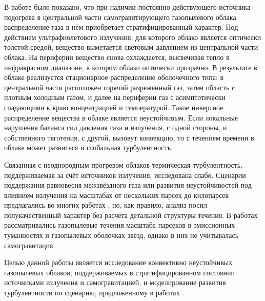 \documentclass[a4paper,11pt,twoside]{article}
\begin{document}
В работе \cite{Zhukova2012} было показано, что при наличии постоянно действующего источника подогрева в центральной части самогравитирующего газопылевого облака распределение газа в нём приобретает стратифицированный характер. Под действием ультрафиолетового излучения, для которого облако является оптически толстой средой, вещество выметается световым давлением из центральной части облака. На периферии вещество снова охлаждается, высвечивая тепло в инфракрасном диапазоне, в котором облако оптически прозрачно. В результате в облаке реализуется стационарное распределение оболочечного типа: в центральной части расположен горячий разреженный газ, затем область с плотным холодным газом, и далее на периферии газ с асимптотически спадающими к краю концентрацией и температурой. Такое инверсное распределение вещества в облаке является неустойчивым. Если локальные нарушения баланса сил давления газа и излучения, с одной стороны, и собственного тяготения, с другой, вызовут конвекцию, то с течением времени в облаке может развиться и глобальная турбулентность.


Связанная с неоднородным прогревом облаков термическая турбулентность, поддерживаемая за счёт источников излучения, исследована слабо.
Сценарии поддержания равновесия межзвёздного газа или развития неустойчивостей под влиянием излучения на масштабах от нескольких парсек до килопарсек предлагались во многих работах \cite{Bianci2005, Ferrara1993, Murray2010}, но, как правило, анализ носил полукачественный характер без расчёта детальной структуры течения. В работах \cite{Freytag2009,Heofner1995,Kreuger1994,Kreuger1997,Mastrodemos1996,Ochsendorf2014,Ochsendorf2014-2,Simis2001,Sorrell2002,Woitke2006} рассматривались газопылевые течения масштаба парсеков в эмиссионных туманностях и газопылевых оболочках звёзд, однако в них не учитывалась самогравитация.

Целью данной работы является исследование конвективно неустойчивых газопылевых облаков, поддерживаемых в стратифицированном состоянии источниками излучения и самогравитацией, и моделирование развития турбулентности по сценарию, предложенному в работах \cite{Zhukova2012,Zhukova2015}.
\end{document}
